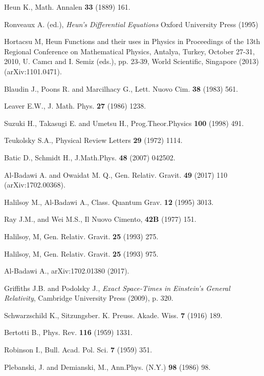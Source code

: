 \documentclass{article}
\begin{document}
\begin{thebibliography}{99}
 Heun K., Math. Annalen \textbf{33} (1889) 161.

 Ronveaux A. (ed.), {\textit{Heun's Differential Equations}} Oxford University Press (1995)

 Hortacsu M, Heun Functions and their uses in Physics in Proceedings of the 13th Regional Conference on Mathematical Physics, Antalya, Turkey, October 27-31, 2010, U. Camc{\i} and I. Semiz (eds.), pp. 23-39, World Scientific, Singapore (2013) (arXiv:1101.0471).

 Blaudin J., Poons R. and Marcilhacy G., Lett. Nuovo Cim. {\bf 38} (1983) 561.

 Leaver E.W., J. Math. Phys. {\bf 27} (1986) 1238.

 Suzuki H., Takasugi E. and Umetsu H., Prog.Theor.Physics {\bf 100} (1998) 491.

 Teukolsky S.A., Physical Review Letters {\bf 29} (1972) 1114.

 Batic D., Schmidt H., J.Math.Phys. {\bf 48} (2007) 042502.

 Al-Badawi A. and Owaidat M. Q., Gen. Relativ. Gravit. {\bf 49}
(2017) 110 (arXiv:1702.00368).

  Halilsoy M., Al-Badawi A., Class. Quantum Grav. {\bf 12} (1995) 3013.

 Ray J.M., and Wei M.S., Il Nuovo Cimento, {\bf 42B} (1977) 151.

 Halilsoy, M, Gen. Relativ. Gravit. {\bf 25} (1993) 275.

 Halilsoy, M, Gen. Relativ. Gravit. {\bf 25} (1993) 975.

 Al-Badawi A., arXiv:1702.01380 (2017).

 Griffiths J.B. and Podolsky J., \emph{Exact Space-Times in Einstein's General Relativity}, Cambridge University Press (2009), p. 320.

 Schwarzschild K.,  Sitzungsber. K. Preuss. Akade. Wiss. {\bf 7} (1916) 189.

 Bertotti B., Phys. Rev. {\bf 116 } (1959) 1331.

 Robinson I., Bull. Acad. Pol. Sci. {\bf 7} (1959) 351.

 Plebanski, J. and Demianski, M., Ann.Phys. (N.Y.) {\bf 98} (1986) 98.


\end{thebibliography}
\end{document}
